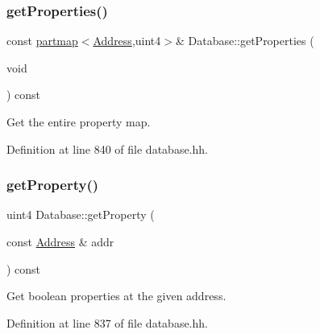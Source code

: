 \subsubsection{\texorpdfstring{getProperties()}{getProperties()}}
{\footnotesize\ttfamily const \mbox{\hyperlink{classpartmap}{partmap}}$<$\mbox{\hyperlink{class_address}{Address}},uint4$>$\& Database\+::get\+Properties (\begin{DoxyParamCaption}\item[{void}]{ }\end{DoxyParamCaption}) const\hspace{0.3cm}{\ttfamily [inline]}}



Get the entire property map. 



Definition at line 840 of file database.\+hh.

\mbox{\label{class_database_a1337718ffa932cf80a4d0d27e9998a06}} 
\subsubsection{\texorpdfstring{getProperty()}{getProperty()}}
{\footnotesize\ttfamily uint4 Database\+::get\+Property (\begin{DoxyParamCaption}\item[{const \mbox{\hyperlink{class_address}{Address}} \&}]{addr }\end{DoxyParamCaption}) const\hspace{0.3cm}{\ttfamily [inline]}}



Get boolean properties at the given address. 



Definition at line 837 of file database.\+hh.

